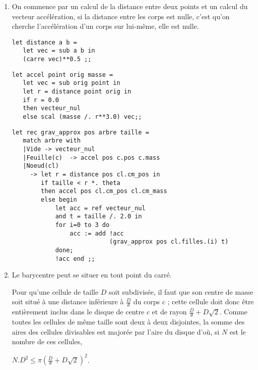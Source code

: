 \begin{Exercise}[title=Gravitation]
\renewcommand{\labelenumi}{\alph{enumi})}
\begin{enumerate}
   \itemsep6mm 
    \item On commence par un calcul de la distance entre deux points et un calcul du vecteur accélération, si la distance entre les corps est nulle, c'est qu'on cherche l'accélération d'un corps sur lui-même, elle est nulle.
\begin{lstlisting}
let distance a b =
   let vec = sub a b in
   (carre vec)**0.5 ;;
\end{lstlisting}

\newpage

\begin{lstlisting}
let accel point orig masse =
   let vec = sub orig point in
   let r = distance point orig in
   if r = 0.0
   then vecteur_nul
   else scal (masse /. r**3.0) vec;;
\end{lstlisting}
\begin{lstlisting}
let rec grav_approx pos arbre taille = 
   match arbre with
   |Vide -> vecteur_nul
   |Feuille(c)  -> accel pos c.pos c.mass
   |Noeud(cl) 
     -> let r = distance pos cl.cm_pos in 
        if taille < r *. theta
        then accel pos cl.cm_pos cl.cm_mass
        else begin
            let acc = ref vecteur_nul 
            and t = taille /. 2.0 in
            for i=0 to 3 do 
                acc := add !acc 
                           (grav_approx pos cl.filles.(i) t) 
            done;
            !acc end ;;
\end{lstlisting}
    \item Le barycentre peut se situer en tout point du carré.
    
    \begin{minipage}{0.5\textwidth}
Pour qu'une cellule de taille $D$ soit subdivisée, il faut que son centre de masse soit situé à une distance inférieure à $\frac D\theta$ du corps $c$ ; cette cellule doit donc être entièrement inclus dans le disque de centre $c$ et de rayon $\frac D\theta + D\sqrt2$. Comme toutes les cellules de même taille sont deux à deux disjointes, la somme des aires des cellules divisables est majorée par l'aire du disque d'où, si $N$ est le nombre de ces cellules, 

 $\displaystyle N.D^2 \le \pi \left(\frac D\theta + D\sqrt2\right)^2$. 
 

\end{minipage}
\end{enumerate}
\end{Exercise}
